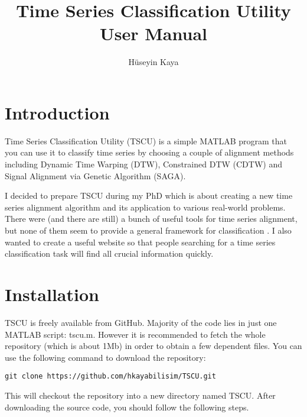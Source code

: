 \documentclass{article}
\title{Time Series Classification Utility\\
User Manual}
\author{H\"useyin Kaya}
\begin{document}
\maketitle
\tableofcontents

\section{Introduction}
Time Series Classification Utility (TSCU) is a simple MATLAB program that you can use it to classify time series by choosing a couple of alignment methods including Dynamic Time Warping (DTW), Constrained DTW (CDTW) and Signal Alignment via Genetic Algorithm (SAGA).

I decided to prepare TSCU during my PhD which is about creating a new time series alignment algorithm and its application to various real-world problems. There were (and there are still) a bunch of useful tools for time series alignment, but none of them seem to provide a general framework for classification \cite{UCRWeb}. I also wanted to create a useful website so that people searching for a time series classification task will find all crucial information quickly.
\section{Installation}
TSCU is freely available from GitHub. Majority of the code lies in just one MATLAB script: tscu.m. However it is recommended to fetch the whole repository (which is about 1Mb) in order to obtain a few dependent files. You can use the following command to download the repository:
\begin{verbatim}
git clone https://github.com/hkayabilisim/TSCU.git
\end{verbatim}
This will checkout the repository into a new directory named TSCU.
After downloading the source code, you should follow the following steps.
\end{document}

